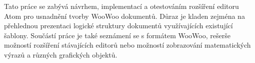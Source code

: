 Tato práce se zabývá návrhem, implementací a otestováním rozšíření editoru Atom pro usnadnění tvorby WooWoo dokumentů.
Důraz je kladen zejména na přehlednou prezentaci logické struktury dokumentů využívajících existující šablony. Součástí
práce je také seznámení se s formátem WooWoo, rešerše možností rozšíření stávajících editorů nebo možností zobrazování
matematických výrazů a různých grafických objektů.
